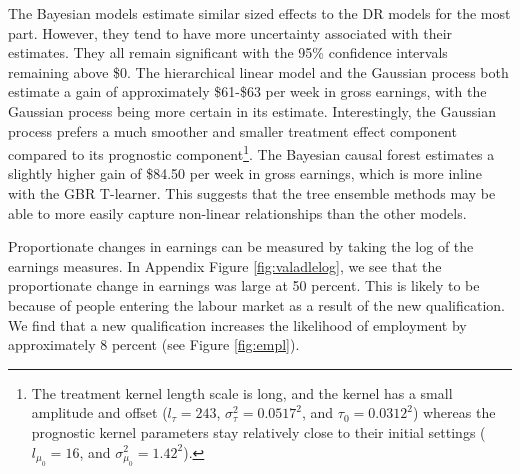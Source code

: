\documentclass[12pt, a4paper]{article}
\begin{document}
The Bayesian models estimate similar sized effects to the DR models for the
most part. However, they tend to have more uncertainty associated with their
estimates. They all remain significant with the 95\% confidence intervals
remaining above \$0. The hierarchical linear model and the Gaussian process
both estimate a gain of approximately \$61-\$63 per week in gross earnings,
with the Gaussian process being more certain in its estimate. Interestingly,
the Gaussian process prefers a much smoother and smaller treatment effect
component compared to its prognostic component\footnote{The treatment kernel length
scale is long, and the kernel has a small amplitude and offset ($l_\tau = 243$,
$\sigma_\tau^2 = 0.0517^2$, and $\tau_0 = 0.0312^2$) whereas the prognostic
kernel parameters stay relatively close to their initial settings ($l_{\mu_0} =
16$, and $\sigma^2_{\mu_0} = 1.42^2$).}. The Bayesian causal forest estimates a
slightly higher gain of \$84.50 per week in gross earnings, which is more inline
with the GBR T-learner. This suggests that the tree ensemble methods may be
able to more easily capture non-linear relationships than the other models.

%

Proportionate changes in earnings can be measured by taking the log of the earnings measures. In Appendix Figure \ref{fig:valadlelog}, we see that the proportionate change in earnings was large at 50 percent. This is likely to be because of people entering the labour market as a result of the new qualification. We find that a new qualification increases the likelihood of employment by approximately 8 percent (see Figure \ref{fig:empl}).
\end{document}

